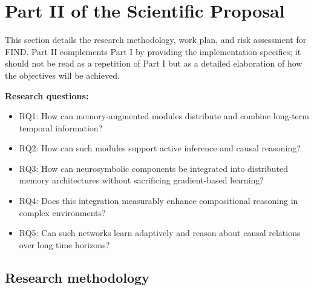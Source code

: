 
\section{Part II of the Scientific Proposal}

This section details the research methodology, work plan, and risk assessment for FIND. Part II complements Part I by providing the implementation specifics; it should not be read as a repetition of Part I but as a detailed elaboration of how the objectives will be achieved.

\textbf{Research questions:}
\begin{itemize}[noitemsep,topsep=2pt]
  \item RQ1: How can memory-augmented modules distribute and combine long-term temporal information?
  \item RQ2: How can such modules support active inference and causal reasoning?
  \item RQ3: How can neurosymbolic components be integrated into distributed memory architectures without sacrificing gradient-based learning?
  \item RQ4: Does this integration measurably enhance compositional reasoning in complex environments?
  \item RQ5: Can such networks learn adaptively and reason about causal relations over long time horizons?
\end{itemize}

\subsection{Research methodology}

